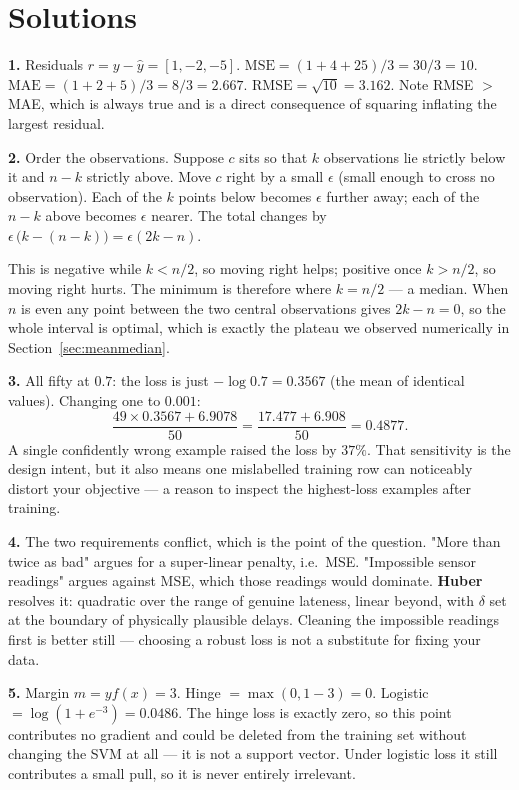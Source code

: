 \documentclass[11pt]{article}
\begin{document}
\newpage
\section{Solutions}
\label{sec:solutions}

\textbf{1.} Residuals $r = y - \hat y = [1, -2, -5]$.
$\mathrm{MSE} = (1 + 4 + 25)/3 = 30/3 = 10$.
$\mathrm{MAE} = (1 + 2 + 5)/3 = 8/3 = 2.667$.
$\mathrm{RMSE} = \sqrt{10} = 3.162$.
Note RMSE $>$ MAE, which is always true and is a direct consequence of squaring
inflating the largest residual.

\medskip
\textbf{2.} Order the observations. Suppose $c$ sits so that $k$ observations
lie strictly below it and $n-k$ strictly above. Move $c$ right by a small
$\epsilon$ (small enough to cross no observation). Each of the $k$ points below
becomes $\epsilon$ further away; each of the $n-k$ above becomes $\epsilon$
nearer. The total changes by $\epsilon\,\big(k - (n-k)\big) = \epsilon(2k-n)$.

This is negative while $k < n/2$, so moving right helps; positive once
$k > n/2$, so moving right hurts. The minimum is therefore where $k = n/2$ ---
a median. When $n$ is even any point between the two central observations gives
$2k - n = 0$, so the whole interval is optimal, which is exactly the plateau we
observed numerically in Section~\ref{sec:meanmedian}.

\medskip
\textbf{3.} All fifty at $0.7$: the loss is just $-\log 0.7 = 0.3567$ (the mean
of identical values). Changing one to $0.001$:
\[
  \frac{49 \times 0.3567 + 6.9078}{50}
  = \frac{17.477 + 6.908}{50} = 0.4877 .
\]
A single confidently wrong example raised the loss by $37\%$. That sensitivity
is the design intent, but it also means one mislabelled training row can
noticeably distort your objective --- a reason to inspect the highest-loss
examples after training.

\medskip
\textbf{4.} The two requirements conflict, which is the point of the question.
"More than twice as bad" argues for a super-linear penalty, i.e.\ MSE.
"Impossible sensor readings" argues against MSE, which those readings would
dominate. \textbf{Huber} resolves it: quadratic over the range of genuine
lateness, linear beyond, with $\delta$ set at the boundary of physically
plausible delays. Cleaning the impossible readings first is better still ---
choosing a robust loss is not a substitute for fixing your data.

\medskip
\textbf{5.} Margin $m = yf(x) = 3$. Hinge $= \max(0, 1-3) = 0$. Logistic
$= \log(1 + e^{-3}) = 0.0486$. The hinge loss is exactly zero, so this point
contributes no gradient and could be deleted from the training set without
changing the SVM at all --- it is not a support vector. Under logistic loss it
still contributes a small pull, so it is never entirely irrelevant.
\end{document}
